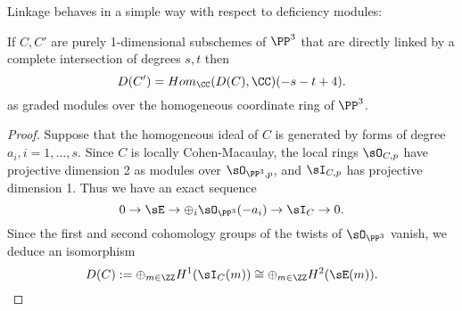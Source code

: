 Linkage behaves in a simple way with respect to deficiency modules:

\begin{theorem}\label{HR}
If $C,C'$ are purely 1-dimensional subschemes of $\PP^3$ that are directly linked by a complete intersection of degrees $s,t$ then
$$
D(C') = Hom_\CC(D(C), \CC) (-s-t+4).
$$ 
as graded modules over the homogeneous coordinate ring of $\PP^3$.
\end{theorem}

\begin{proof}

Suppose that the homogeneous ideal of $C$ is generated by forms of degree $a_i, i=1,\dots,s$. Since $C$ is locally Cohen-Macaulay,
the local rings $\sO_{C,p}$ have projective dimension 2 as modules over $\sO_{\PP^3, p}$, and $\sI_{C,p}$ has projective dimension 1.
Thus we have an exact sequence
$$
0\to \sE \to \oplus_i\sO_{\PP^3}(-a_i) \to \sI_C \to 0.
$$
Since the first and second cohomology groups of the twists of $\sO_{\PP^3}$ vanish, we deduce an isomorphism
$$
D(C) := \oplus_{m\in \ZZ} H^1(\sI_C(m)) \cong \oplus_{m\in \ZZ} H^2(\sE(m)).
$$


\end{proof}
